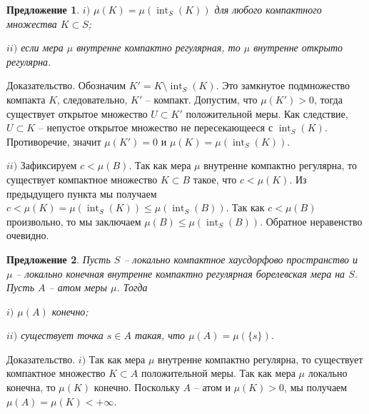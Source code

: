 \documentclass[12pt]{article}
\numberwithin{equation}{subsection}
\theoremstyle{plain}
\newtheorem{proposition}{Предложение}
\newenvironment{proof}{Доказательство.}{}
\begin{document}
\begin{fulltext}
\begin{proposition}
        $i)$ $\mu(K)=\mu(\operatorname{int}_S(K))$ для любого компактного множества $K\subset S$;

        $ii)$ если мера $\mu$ внутренне компактно регулярная, то $\mu$ внутренне открыто регулярна.
    \end{proposition}
    \begin{proof} Обозначим $K'=K\setminus \operatorname{int}_S(K)$. Это замкнутое подмножество компакта $K$, следовательно, $K'$ -- компакт. Допустим, что $\mu(K')>0$, тогда существует открытое множество $U\subset K'$ положительной меры. Как следствие, $U\subset K$ -- непустое открытое множество не пересекающееся с $\operatorname{int}_S(K)$. Противоречие, значит $\mu(K')=0$ и $\mu(K)=\mu(\operatorname{int}_S(K))$.

        $ii)$ Зафиксируем $c<\mu(B)$. Так как мера $\mu$ внутренне компактно регулярна, то существует компактное множество $K\subset B$ такое, что $c<\mu(K)$. Из предыдущего пункта мы получаем $c<\mu(K)=\mu(\operatorname{int}_S(K))\leq\mu(\operatorname{int}_S(B))$. Так как $c<\mu(B)$ произвольно, то мы заключаем $\mu(B)\leq\mu(\operatorname{int}_S(B))$. Обратное неравенство очевидно.
    \end{proof}

    \begin{proposition}\label{MeasAtomCharac} Пусть $S$ -- локально компактное хаусдорфово пространство и $\mu$ -- локально конечная внутренне компактно регулярная борелевская мера на $S$. Пусть $A$ -- атом меры $\mu$. Тогда

        $i)$ $\mu(A)$ конечно;

        $ii)$ существует точка $s\in A$ такая, что $\mu(A)=\mu(\{s\})$.
    \end{proposition}
    \begin{proof} $i)$ Так как мера $\mu$ внутренне компактно регулярна, то существует компактное множество $K\subset A$ положительной меры. Так как мера $\mu$ локально конечна, то $\mu(K)$ конечно. Поскольку $A$ -- атом и $\mu(K)>0$, мы получаем $\mu(A)=\mu(K)<+\infty$.


\end{proof}
\end{fulltext}
\end{document}
